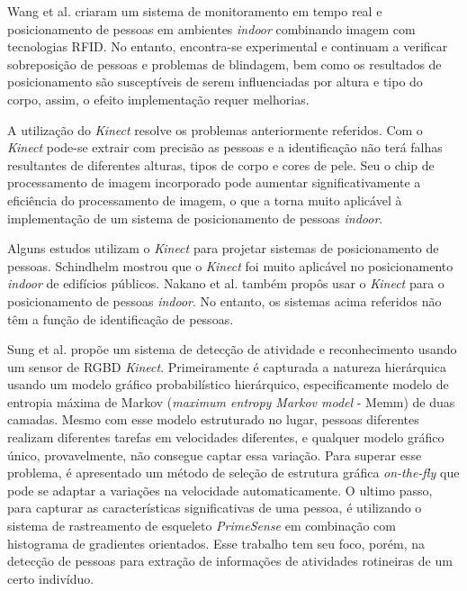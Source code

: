 Wang et al. \cite{wang2011flexible,wang2011rfid} criaram um sistema de monitoramento em tempo real e posicionamento de pessoas em ambientes \textit{indoor} combinando imagem com  tecnologias RFID. No entanto, encontra-se experimental e continuam a verificar sobreposição de pessoas e problemas de blindagem, bem como os resultados de posicionamento são susceptíveis de serem influenciadas por altura e tipo do corpo, assim, o efeito implementação requer melhorias.

A utilização do \textit{Kinect} resolve os problemas anteriormente referidos. Com o \textit{Kinect} pode-se extrair com precisão as pessoas e a identificação não terá falhas resultantes de diferentes alturas, tipos de corpo e cores de pele. Seu o chip de processamento de imagem incorporado pode aumentar significativamente a eficiência do processamento de imagem, o que a torna muito aplicável à implementação de um sistema de posicionamento de pessoas \textit{indoor}.

Alguns estudos utilizam o \textit{Kinect} para projetar sistemas de posicionamento de pessoas. Schindhelm \cite{schindhelm2012evaluating} mostrou que o \textit{Kinect} foi muito aplicável no posicionamento \textit{indoor} de edifícios públicos. Nakano et al. \cite{nakano2012kinect} também propôs usar o \textit{Kinect} para o posicionamento de pessoas \textit{indoor}. No entanto, os sistemas acima referidos não têm a função de identificação de pessoas. 

Sung et al. \cite{sung2012unstructured} propõe um sistema de detecção de atividade e reconhecimento usando um sensor de RGBD \textit{Kinect}. Primeiramente é capturada a natureza hierárquica usando um modelo gráfico probabilístico hierárquico, especificamente modelo de entropia máxima de Markov (\textit{maximum entropy Markov model } - Memm) de duas camadas. Mesmo com esse modelo estruturado no lugar, pessoas diferentes realizam diferentes tarefas em velocidades diferentes, e qualquer modelo gráfico único, provavelmente, não consegue captar essa variação. Para superar esse problema, é apresentado um método de seleção de estrutura gráfica \textit{on-the-fly} que pode se adaptar a variações na velocidade automaticamente. O ultimo passo, para capturar as características significativas de uma pessoa, é utilizando o sistema de rastreamento de esqueleto \textit{PrimeSense} \cite{primeSence2014} em combinação com histograma de gradientes orientados. Esse trabalho tem seu foco, porém, na detecção de pessoas para extração de informações de atividades rotineiras de um certo indivíduo.


